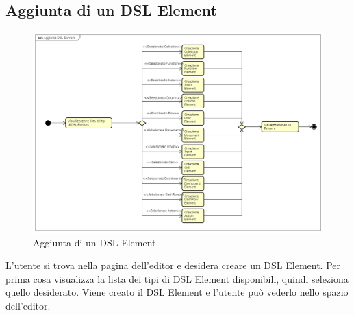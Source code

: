     \subsection{Aggiunta di un DSL Element}
    \begin{figure}[H]
      \centering
      \includegraphics[width=1.1\textwidth]{res/img/aggiuntaDSLElement.png}
      \caption{Aggiunta di un DSL Element}
      \label{fig:diagram_model}
    \end{figure}
    L'utente si trova nella pagina dell'editor e desidera creare un DSL Element. Per prima cosa visualizza la lista dei tipi di DSL Element disponibili, quindi seleziona quello desiderato. Viene creato il DSL Element e l'utente può vederlo nello spazio dell'editor.
